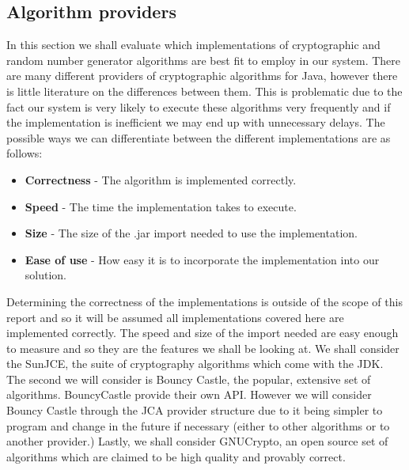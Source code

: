 \documentclass[12pt, titlepage]{article}
\begin{document}
\subsection{Algorithm providers}
In this section we shall evaluate which implementations of cryptographic and random number generator algorithms are best fit to employ in our system.
\newline \indent There are many different providers of cryptographic algorithms for Java, however there is little literature on the differences between them. This is problematic due to the fact our system is very likely to execute these algorithms very frequently and if the implementation is inefficient we may end up with unnecessary delays. The possible ways we can differentiate between the different implementations are as follows:
\begin{itemize}
	\item \textbf{Correctness} - The algorithm is implemented correctly.
	\item \textbf{Speed} - The time the implementation takes to execute.
	\item \textbf{Size} - The size of the .jar import needed to use the implementation.
	\item \textbf{Ease of use} - How easy it is to incorporate the implementation into our solution.
\end{itemize}
Determining the correctness of the implementations is outside of the scope of this report and so it will be assumed all implementations covered here are implemented correctly. The speed and size of the import needed are easy enough to measure and so they are the features we shall be looking at.
\newline \indent We shall consider the SunJCE, the suite of cryptography algorithms which come with the JDK. The second we will consider is Bouncy Castle, the popular, extensive set of algorithms. BouncyCastle provide their own API. However we will consider Bouncy Castle through the JCA provider structure due to it being simpler to program and change in the future if necessary (either to other algorithms or to another provider.) Lastly, we shall consider GNUCrypto, an open source set of algorithms which are claimed to be high quality and provably correct.
\end{document}
